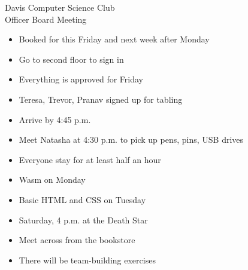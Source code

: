\documentclass{article}
\begin{document}
\begin{Minutes}{Davis Computer Science Club\\Officer Board Meeting}




\maketitle

\begin{itemize}
\item Booked for this Friday and next week after Monday
\item Go to second floor to sign in
\end{itemize}

\begin{itemize}
\item Everything is approved for Friday
\item Teresa, Trevor, Pranav signed up for tabling
\item Arrive by 4:45 p.m.
\item Meet Natasha at 4:30 p.m. to pick up pens, pins, USB drives
\end{itemize}

\begin{itemize}
\item Everyone stay for at least half an hour
\end{itemize}

\begin{itemize}
\item Wasm on Monday
\item Basic HTML and CSS on Tuesday
\end{itemize}

\begin{itemize}
\item Saturday, 4 p.m. at the Death Star
\item Meet across from the bookstore
\item There will be team-building exercises
\end{itemize}


\end{Minutes}
\end{document}
